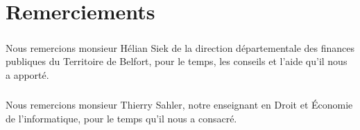 \chapter*{Remerciements}

\paragraph{}
    Nous remercions monsieur Hélian Siek de la direction départementale des
    finances publiques du Territoire de Belfort, pour le temps, les conseils et l'aide qu'il nous a apporté.

\paragraph{}
    Nous remercions monsieur Thierry Sahler, notre enseignant en Droit et Économie de l'informatique, pour le temps qu'il nous a consacré.
